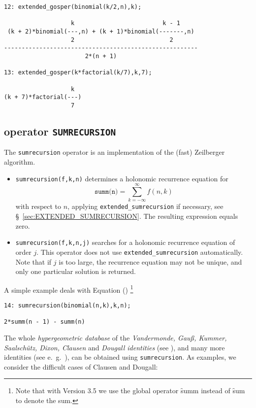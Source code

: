 {\small
\begin{verbatim}
12: extended_gosper(binomial(k/2,n),k);

                   k                         k - 1
 (k + 2)*binomial(---,n) + (k + 1)*binomial(-------,n)
                   2                           2
-------------------------------------------------------
                       2*(n + 1)

13: extended_gosper(k*factorial(k/7),k,7);

                   k
(k + 7)*factorial(---)
                   7
\end{verbatim}
}\noindent

\subsection{\REDUCE{} operator \texttt{SUMRECURSION}}
\hypertarget{operator:SUMRECURSION}{}

The \texttt{sumrecursion} operator is an implementation of the (fast)
Zeilberger algorithm.
\begin{itemize}
\item
\texttt{sumrecursion(f,k,n)} determines a holonomic recurrence equation
for
\[
\texttt{summ(n)} =\sum\limits_{k=-\infty}^\infty f(n,k)
\]
with respect to $n$, applying
\texttt{extended\_sumrecursion} if necessary,
see \S~\ref{sec:EXTENDED_SUMRECURSION}.
The resulting expression equals zero.
\item
\texttt{sumrecursion(f,k,n,j)} %
searches for a holonomic recurrence equation of order $j$. This
operator does not use \texttt{extended\_sumrecursion} automatically.
Note that if $j$ is too large, the recurrence equation
may not be unique, and only one particular solution is returned.
\end{itemize}
A simple example deals with Equation ()%
\footnote{Note that with \REDUCE{} Version 3.5 we use the global operator
\hypertarget{operator:SUMM}{\f{summ}} instead of \f{sum} to denote the sum.}

{\small
\begin{verbatim}
14: sumrecursion(binomial(n,k),k,n);

2*summ(n - 1) - summ(n)
\end{verbatim}
}\noindent
The whole \textsl{hypergeometric database} of the
\textsl{Vandermonde, Gau{\ss}, Kummer, Saalsch\"utz, Dixon, Clausen} and \textsl{Dougall
identities} (see \cite{Wilf:93}), and many more identities (see e.\ g.\
\cite{Koepf:94b}), can be obtained using \texttt{sumrecursion}.
As examples, we consider the difficult cases of Clausen and Dougall:%

